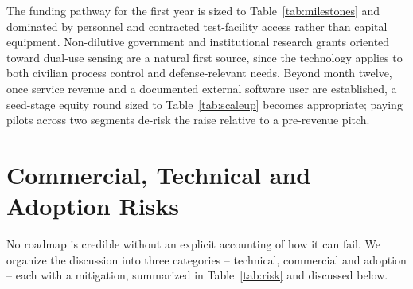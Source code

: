 The funding pathway for the first year is sized to Table~\ref{tab:milestones} and dominated by personnel and contracted test-facility access rather than capital equipment. Non-dilutive government and institutional research grants oriented toward dual-use sensing are a natural first source, since the technology applies to both civilian process control and defense-relevant needs. Beyond month twelve, once service revenue and a documented external software user are established, a seed-stage equity round sized to Table~\ref{tab:scaleup} becomes appropriate; paying pilots across two segments de-risk the raise relative to a pre-revenue pitch.

\section{Commercial, Technical and Adoption Risks}
\label{sec:risk}

No roadmap is credible without an explicit accounting of how it can fail. We organize the discussion into three categories -- technical, commercial and adoption -- each with a mitigation, summarized in Table~\ref{tab:risk} and discussed below.


